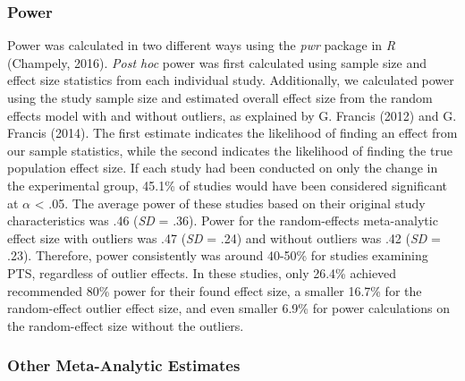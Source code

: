 \documentclass[english,man, mask]{apa6}
\theoremstyle{definition}
\theoremstyle{definition}
\theoremstyle{definition}
\theoremstyle{remark}
\begin{document}
\subsubsection{Power}\label{power}

Power was calculated in two different ways using the \emph{pwr} package
in \emph{R} (Champely, 2016). \emph{Post hoc} power was first calculated
using sample size and effect size statistics from each individual study.
Additionally, we calculated power using the study sample size and
estimated overall effect size from the random effects model with and
without outliers, as explained by G. Francis (2012) and G. Francis
(2014). The first estimate indicates the likelihood of finding an effect
from our sample statistics, while the second indicates the likelihood of
finding the true population effect size. If each study had been
conducted on only the change in the experimental group, 45.1\% of
studies would have been considered significant at \(\alpha\) \textless{}
.05. The average power of these studies based on their original study
characteristics was .46 (\emph{SD} = .36). Power for the random-effects
meta-analytic effect size with outliers was .47 (\emph{SD} = .24) and
without outliers was .42 (\emph{SD} = .23). Therefore, power
consistently was around 40-50\% for studies examining PTS, regardless of
outlier effects. In these studies, only 26.4\% achieved recommended 80\%
power for their found effect size, a smaller 16.7\% for the
random-effect outlier effect size, and even smaller 6.9\% for power
calculations on the random-effect size without the outliers.

\subsubsection{Other Meta-Analytic
Estimates}\label{other-meta-analytic-estimates}
\end{document}
